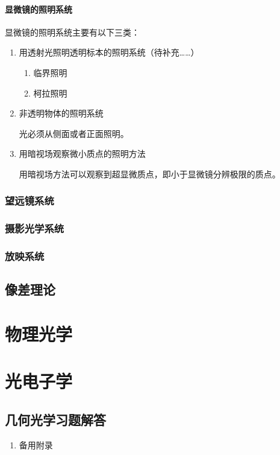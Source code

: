 \documentclass[cn,10pt,chinesefont=founder,math=newtx,cite=super,twoside]{elegantbook}
\begin{document}
\subsection{显微镜的照明系统}
显微镜的照明系统主要有以下三类：
\begin{enumerate}
	\item 用透射光照明透明标本的照明系统（待补充……）
	\begin{enumerate}
		\item 临界照明
		\item 柯拉照明
	\end{enumerate}
	\item 非透明物体的照明系统
	
	光必须从侧面或者正面照明。
	\item 用暗视场观察微小质点的照明方法
	
	用暗视场方法可以观察到超显微质点，即小于显微镜分辨极限的质点。
\end{enumerate}

\section{望远镜系统}

\section{摄影光学系统}

\section{放映系统}


\chapter{像差理论}



\part{物理光学}

\part{光电子学}

%
\appendix
\chapter{几何光学习题解答}
\begin{enumerate}[itemsep=1.5ex]

	\item 备用附录
	
\end{enumerate}
\end{document}
